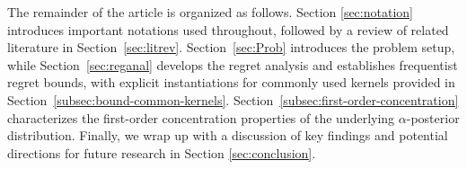 \documentclass[final,12pt]{colt2026} %
\begin{document}
The remainder of the article is organized as follows. Section \ref{sec:notation} introduces important notations used throughout, followed by a review of related literature in Section~\ref{sec:litrev}. Section~\ref{sec:Prob} introduces the problem setup, while Section~\ref{sec:reganal} develops the regret analysis and establishes frequentist regret bounds, with explicit instantiations for commonly used kernels provided in Section~\ref{subsec:bound-common-kernels}.
Section~\ref{subsec:first-order-concentration} characterizes the first-order concentration properties of the underlying $\alpha$-posterior distribution. Finally, we wrap up with a discussion of key findings and potential directions for future research in Section \ref{sec:conclusion}.
\end{document}
